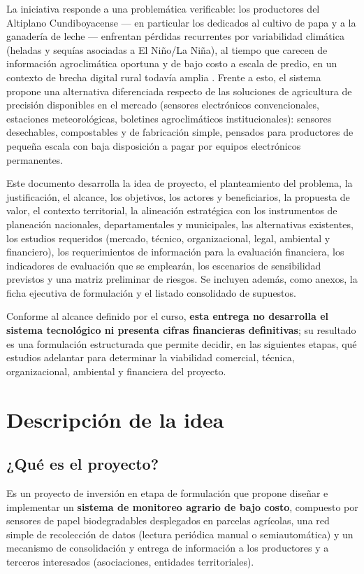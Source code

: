 \documentclass[11pt,a4paper]{article}
\begin{document}
La iniciativa responde a una problemática verificable: los productores del Altiplano Cundiboyacense --- en particular los dedicados al cultivo de papa y a la ganadería de leche --- enfrentan pérdidas recurrentes por variabilidad climática (heladas y sequías asociadas a El Niño/La Niña), al tiempo que carecen de información agroclimática oportuna y de bajo costo a escala de predio, en un contexto de brecha digital rural todavía amplia \citep{boyaca7dias2026,semana2020,mintic2023}. Frente a esto, el sistema propone una alternativa diferenciada respecto de las soluciones de agricultura de precisión disponibles en el mercado (sensores electrónicos convencionales, estaciones meteorológicas, boletines agroclimáticos institucionales): sensores desechables, compostables y de fabricación simple, pensados para productores de pequeña escala con baja disposición a pagar por equipos electrónicos permanentes.

Este documento desarrolla la idea de proyecto, el planteamiento del problema, la justificación, el alcance, los objetivos, los actores y beneficiarios, la propuesta de valor, el contexto territorial, la alineación estratégica con los instrumentos de planeación nacionales, departamentales y municipales, las alternativas existentes, los estudios requeridos (mercado, técnico, organizacional, legal, ambiental y financiero), los requerimientos de información para la evaluación financiera, los indicadores de evaluación que se emplearán, los escenarios de sensibilidad previstos y una matriz preliminar de riesgos. Se incluyen además, como anexos, la ficha ejecutiva de formulación y el listado consolidado de supuestos.

Conforme al alcance definido por el curso, \textbf{esta entrega no desarrolla el sistema tecnológico ni presenta cifras financieras definitivas}; su resultado es una formulación estructurada que permite decidir, en las siguientes etapas, qué estudios adelantar para determinar la viabilidad comercial, técnica, organizacional, ambiental y financiera del proyecto.

\section{Descripción de la idea}

\subsection{¿Qué es el proyecto?}
Es un proyecto de inversión en etapa de formulación que propone diseñar e implementar un \textbf{sistema de monitoreo agrario de bajo costo}, compuesto por sensores de papel biodegradables desplegados en parcelas agrícolas, una red simple de recolección de datos (lectura periódica manual o semiautomática) y un mecanismo de consolidación y entrega de información a los productores y a terceros interesados (asociaciones, entidades territoriales).
\end{document}
